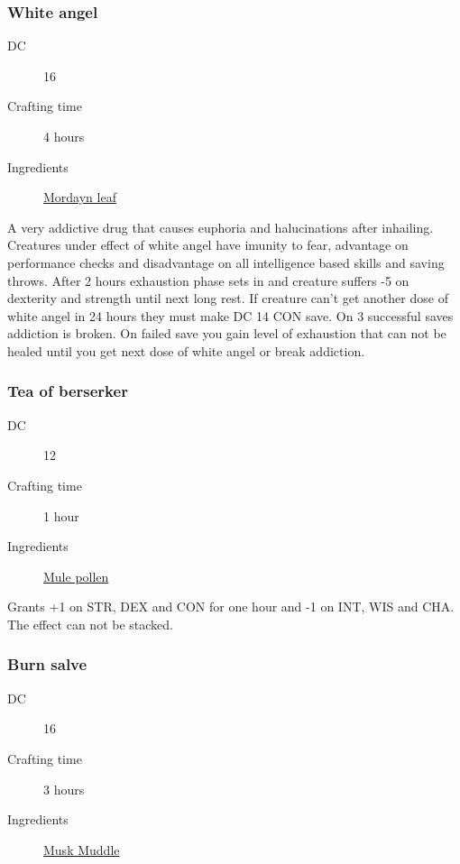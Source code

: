 \subsubsection{White angel}
\label{White angel}

\begin{description}
\item [DC] 16
\item [Crafting time] 4 hours
\item [Ingredients] \hyperref[Mordayn]{Mordayn leaf}
\end{description}

A very addictive drug that causes euphoria and halucinations after inhailing. 
Creatures under effect of white angel have imunity to fear, advantage on performance checks and disadvantage
 on all intelligence based skills and saving throws. 
 After 2 hours exhaustion phase sets in and creature suffers -5 on dexterity and strength 
 until next long rest. If creature can't get another dose of white angel in 24 hours they must make 
 DC 14 CON save. On 3 successful saves addiction is broken. 
 On failed save you gain level of exhaustion that can not be healed until you get next dose 
 of white angel or break addiction.

\subsubsection{Tea of berserker}
\label{Tea of berserker}

\begin{description}
\item [DC] 12
\item [Crafting time] 1 hour
\item [Ingredients] \hyperref[Mule Pollen]{Mule pollen}
\end{description}

Grants +1 on STR, DEX and CON for one hour and -1 on INT, WIS and CHA. The effect can not be stacked.

\subsubsection{Burn salve}
\label{Burn salve}

\begin{description}
\item [DC] 16
\item [Crafting time] 3 hours
\item [Ingredients] \hyperref[Musk Muddle]{Musk Muddle}
\end{description}

